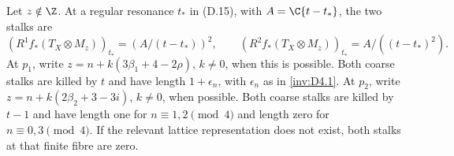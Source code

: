 \begin{proposition}\label{inv:D4.4}
Let $z\notin\Z$. At a regular resonance $t_*$ in (D.15), with
$A=\C\{t-t_*\}$, the two stalks are
\[
 (R^1f_*(T_X\otimes M_z))_{t_*}=(A/(t-t_*))^2,
 \qquad (R^2f_*(T_X\otimes M_z))_{t_*}=A/((t-t_*)^2).    \tag{D.18}
\]
At $p_1$, write $z=n+k(3\beta_1+4-2\rho)$, $k\ne0$, when this is
possible. Both coarse stalks are killed by $t$ and have length
$1+\epsilon_n$, with $\epsilon_n$ as in \ref{inv:D4.1}.
At $p_2$, write $z=n+k(2\beta_2+3-3i)$, $k\ne0$, when possible.
Both coarse stalks are killed by $t-1$ and have length one for
$n\equiv1,2\pmod4$ and length zero for $n\equiv0,3\pmod4$.
If the relevant lattice representation does not exist, both stalks
at that finite fibre are zero.
\end{proposition}


